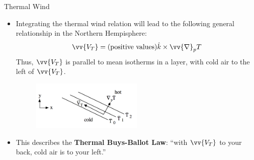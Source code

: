 \begin{frame}{Thermal Wind}

\begin{itemize}
	\item Integrating the thermal wind relation will lead to the following general relationship in the Northern Hempisphere:
	$$\vv{V_T} = (\text{positive values})\hat k \times \vv{\nabla}_p T$$
	Thus, $\vv{V_T}$ is parallel to mean isotherms in a layer, with cold air to the left of $\vv{V_T}$.
	\begin{figure}
	\includegraphics[width=0.5\textwidth]{thermal3}	
	\end{figure}
	\item This describes the \textbf{Thermal Buys-Ballot Law}: ``with $\vv{V_T}$ to your back, cold air is to your left.''
\end{itemize}
\end{frame}



